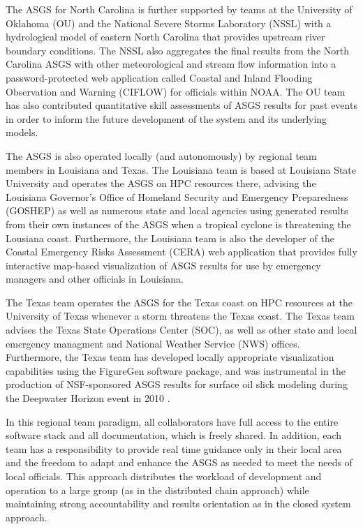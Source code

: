 \documentclass[jmse,article,submit,moreauthors,pdftex,12pt,a4paper]{mdpi}
\begin{document}
The ASGS for North Carolina is further supported by teams at the 
University of Oklahoma (OU) and the National Severe Storms 
Laboratory (NSSL) with a hydrological model of eastern North 
Carolina that provides upstream river boundary conditions. The NSSL 
also aggregates the final results from the North Carolina ASGS with 
other meteorological and stream flow information into a 
password-protected web application called Coastal and Inland 
Flooding Observation and Warning (CIFLOW) \cite {VanCootenS2011} for 
officials within NOAA. The OU team has also contributed quantitative
skill assessments of ASGS results for past events in order to 
inform the future development of the system and its underlying 
models. \cite{DresbackKM2013}

The ASGS is also operated locally (and autonomously) by regional 
team members in Louisiana and Texas. The Louisiana team is based at 
Louisiana State University and operates the ASGS on HPC resources 
there, advising the Louisiana Governor's Office of Homeland Security 
and Emergency Preparedness (GOSHEP)  as well as numerous state and 
local agencies using generated results from their own instances of 
the ASGS when a tropical cyclone is threatening the Lousiana coast. 
Furthermore, the Louisiana team is also the developer of the Coastal 
Emergency Risks Assessment (CERA) web application that provides 
fully interactive map-based visualization of ASGS results for use by 
emergency managers and other officials in Louisiana.

The Texas team operates the ASGS for the Texas coast on HPC 
resources at the University of Texas \cite{DietrichJC2013} whenever 
a storm threatens the Texas coast. The Texas team advises the Texas 
State Operations Center (SOC), as well as other state and local 
emergency managment and National Weather Service (NWS) offices. 
Furthermore, the Texas team has developed locally appropriate 
visualization capabilities using the FigureGen software package, and 
was instrumental in the production of NSF-sponsored ASGS results for 
surface oil slick modeling during the Deepwater Horizon event in 
2010 \cite {DietrichJC2012}. 

In this regional team paradigm, all collaborators have full access 
to the entire software stack and all documentation, which is freely 
shared. In addition, each team has a responsibility to provide real 
time guidance only in their local area and the freedom to adapt and 
enhance the ASGS as needed to meet the needs of local officials. 
This approach distributes the workload of development and operation 
to a large group (as in the distributed chain approach) while 
maintaining strong accountability and results orientation as in the 
closed system approach. 
\end{document}

